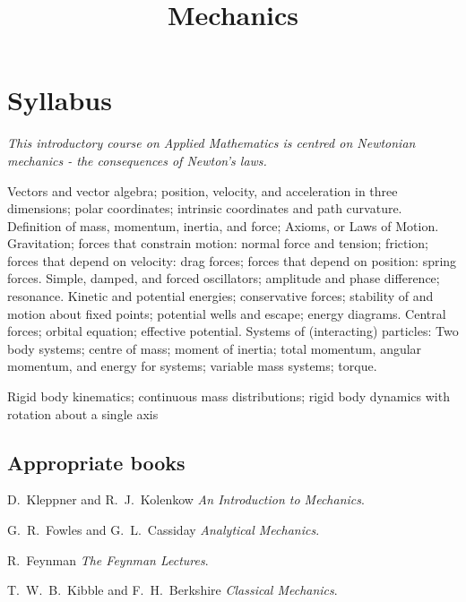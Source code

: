 \documentclass[twoside]{scrartcl}
\title{Mechanics}
\begin{document}
{
\section*{Syllabus} 

\textit{This introductory course on Applied Mathematics is centred on Newtonian mechanics - the consequences of Newton’s laws.}

\vspace*{-5pt} Vectors and vector algebra; position, velocity, and acceleration in three dimensions; polar coordinates; intrinsic coordinates and path curvature.
\vspace*{-5pt} Definition of mass, momentum, inertia, and force; Axioms, or Laws of Motion. 
\vspace*{-5pt} Gravitation; forces that constrain motion: normal force and tension; friction; forces that depend on velocity: drag forces; forces that depend on position: spring forces. 
\vspace*{-5pt} Simple, damped, and forced oscillators; amplitude and phase difference; resonance.
\vspace*{-5pt} Kinetic and potential energies; conservative forces; stability of and motion about fixed points; potential wells and escape; energy diagrams.
\vspace*{-5pt}Central forces; orbital equation; effective potential. Systems of (interacting) particles: Two body systems; centre of mass; moment of inertia; total momentum, angular momentum, and energy for systems; variable mass systems; torque. 

\vspace*{-5pt}Rigid body kinematics; continuous mass distributions; rigid body dynamics with rotation about a single axis

\subsection*{Appropriate books}

{\shortskip
D.~Kleppner and R.~J.~Kolenkow \emph{An Introduction to Mechanics}.

G.~R.~Fowles and G.~L.~Cassiday \emph{Analytical Mechanics}.

R.~Feynman \emph{The Feynman Lectures}.

T.~W.~B.~Kibble and F.~H.~Berkshire \emph{Classical Mechanics}.

}
}
\end{document}
